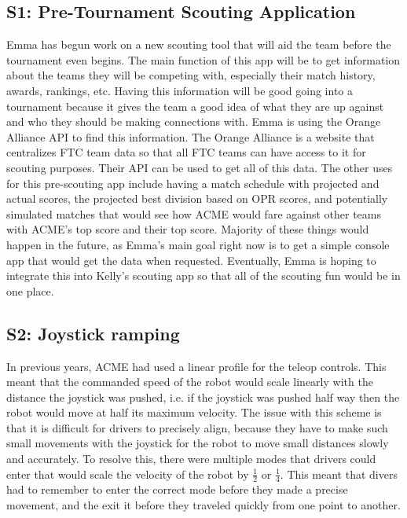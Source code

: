 \documentclass{article}
\begin{document}
\subsection{S1: Pre-Tournament Scouting Application}

Emma has begun work on a new scouting tool that will aid the team before the tournament even begins. The main function of this app will be to get information about the teams they will be competing with, especially their match history, awards, rankings, etc. Having this information will be good going into a tournament because it gives the team a good idea of what they are up against and who they should be making connections with. Emma is using the Orange Alliance API to find this information. The Orange Alliance is a website that centralizes FTC team data so that all FTC teams can have access to it for scouting purposes. Their API can be used to get all of this data. The other uses for this pre-scouting app include having a match schedule with projected and actual scores, the projected best division based on OPR scores, and potentially simulated matches that would see how ACME would fare against other teams with ACME's top score and their top score. Majority of these things would happen in the future, as Emma's main goal right now is to get a simple console app that would get the data when requested. Eventually, Emma is hoping to integrate this into Kelly's scouting app so that all of the scouting fun would be in one place. 

\subsection{S2: Joystick ramping}

In previous years, ACME had used a linear profile for the teleop controls. This meant that the commanded speed of the robot would scale linearly with the distance the joystick was pushed, i.e. if the joystick was pushed half way then the robot would move at half its maximum velocity. The issue with this scheme is that it is difficult for drivers to precisely align, because they have to make such small movements with the joystick for the robot to move small distances slowly and accurately. To resolve this, there were multiple modes that drivers could enter that would scale the velocity of the robot by $\frac{1}{2}$ or $\frac{1}{4}$. This meant that divers had to remember to enter the correct mode before they made a precise movement, and the exit it before they traveled quickly from one point to another. 
\end{document}
